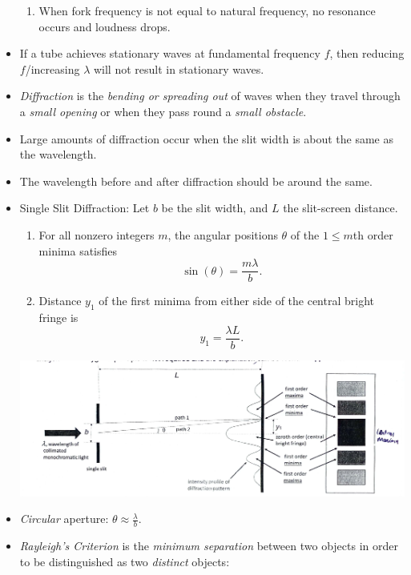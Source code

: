 \documentclass[oneside]{book}
\begin{document}
\begin{itemize}
\begin{example}{}{}
\begin{enumerate}
            \item When fork frequency is not equal to natural frequency, no resonance occurs and loudness drops.
        \end{enumerate}
    \end{example}
    \item If a tube achieves stationary waves at fundamental frequency \(f\), then reducing \(f\)/increasing \(\lambda\) will not result in stationary waves.
    \item \emph{Diffraction} is the \emph{bending or spreading out} of waves when they travel through a \emph{small opening} or when they pass round a \emph{small obstacle}.
    \item Large amounts of diffraction occur when the slit width is about the same as the wavelength.
    \item The wavelength before and after diffraction should be around the same.
    \item Single Slit Diffraction: Let \(b\) be the slit width, and \(L\) the slit-screen distance.
    \begin{enumerate}
        \item For all nonzero integers \(m\), the angular positions \(\theta\) of the \(1 \leq m\)th order minima satisfies 
        \[\sin(\theta)=\frac{m\lambda}{b}.\] 
        \item Distance \(y_1\) of the first minima from either side of the central bright fringe is
        \[y_1=\frac{\lambda L}{b}.\]
    \end{enumerate}
    \begin{center}
        \includegraphics[scale=0.1]{../images/Single Slit Diffraction.jpg}
        \captionsetup{type=figure}
    \end{center}
    \item \emph{Circular} aperture: \(\theta \approx \frac{\lambda}{b}\).
    \item \emph{Rayleigh's Criterion} is the \emph{minimum separation} between two objects in order to be distinguished as two \emph{distinct} objects:

\end{itemize}
\end{document}
